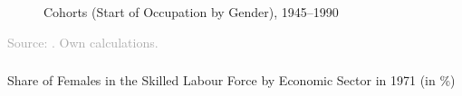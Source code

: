 \documentclass[11pt, aspectratio=1610, xcolor={dvipsnames}]{beamer}
\begin{document}
	\begin{frame}
		\frametitle{}
		
		\begin{figure}[h]
			\centering
			\caption{Cohorts (Start of Occupation by Gender), 1945--1990}
			\label{fig:validity}
			\resizebox{75mm}{!}{}
		\end{figure}
		
		{\scriptsize
			\textcolor{darkgray}{Source: \cite{Mayer1995}. Own calculations.}
		}
		
	\end{frame}
	
	\begin{frame}
		\frametitle{}
		
		{\linespread{1}\tiny
			\begin{table}[h]
				\centering
				\caption{Share of Females in the Skilled Labour Force by Economic Sector in 1971 (in \%)}
				\label{tab:gdr_yearbook}
				

\end{table}}
\end{frame}
\end{document}
